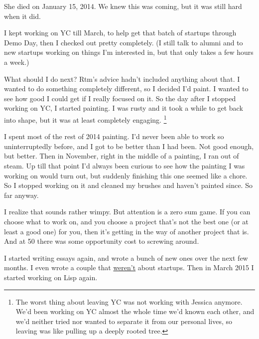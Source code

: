 \documentclass[12pt]{book}
\begin{document}
She died on January 15, 2014. We knew this was coming, but it was still
hard when it did.

I kept working on YC till March, to help get that batch of startups
through Demo Day, then I checked out pretty completely. (I still talk to
alumni and to new startups working on things I'm interested in, but that
only takes a few hours a week.)

What should I do next? Rtm's advice hadn't included anything about that.
I wanted to do something completely different, so I decided I'd paint. I
wanted to see how good I could get if I really focused on it. So the day
after I stopped working on YC, I started painting. I was rusty and it
took a while to get back into shape, but it was at least completely
engaging. \footnote{The worst thing about leaving YC was not working with Jessica
anymore. We'd been working on YC almost the whole time we'd known each
other, and we'd neither tried nor wanted to separate it from our
personal lives, so leaving was like pulling up a deeply rooted tree.}

I spent most of the rest of 2014 painting. I'd never been able to work
so uninterruptedly before, and I got to be better than I had been. Not
good enough, but better. Then in November, right in the middle of a
painting, I ran out of steam. Up till that point I'd always been curious
to see how the painting I was working on would turn out, but suddenly
finishing this one seemed like a chore. So I stopped working on it and
cleaned my brushes and haven't painted since. So far anyway.

I realize that sounds rather wimpy. But attention is a zero sum game. If
you can choose what to work on, and you choose a project that's not the
best one (or at least a good one) for you, then it's getting in the way
of another project that is. And at 50 there was some opportunity cost to
screwing around.

I started writing essays again, and wrote a bunch of new ones over the
next few months. I even wrote a couple that \href{know.html}{weren't}
about startups. Then in March 2015 I started working on Lisp again.
\end{document}
